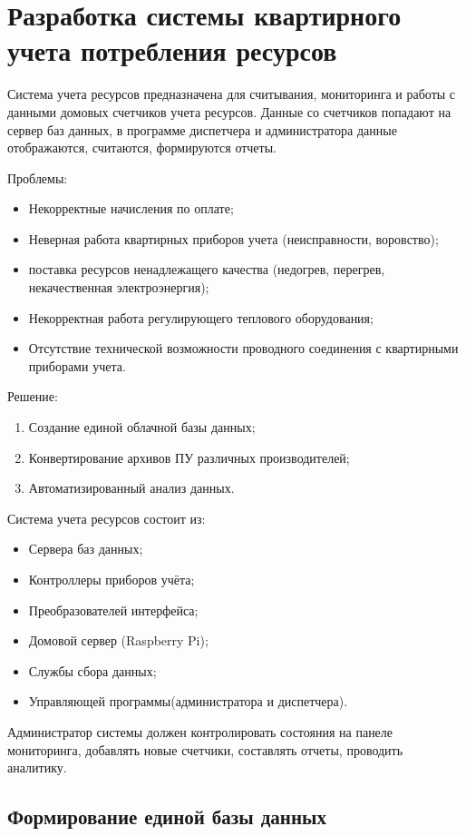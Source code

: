 
\section{Разработка системы квартирного учета потребления ресурсов}
Система учета ресурсов предназначена для считывания, мониторинга и работы с данными домовых счетчиков учета ресурсов. Данные со счетчиков попадают на сервер баз данных, в программе диспетчера и администратора данные отображаются, считаются, формируются отчеты. \cite{NK}

Проблемы:  
\begin{itemize}
	\item Некорректные начисления по оплате; 
	\item Неверная работа квартирных приборов учета (неисправности, воровство); 
	\item поставка ресурсов ненадлежащего качества (недогрев, перегрев, некачественная электроэнергия);
	\item Некорректная работа регулирующего теплового оборудования; 
	\item Отсутствие технической возможности проводного соединения с квартирными приборами учета.
\end{itemize}

Решение: 
\begin{enumerate}
	\item Создание единой облачной базы данных; 
	\item Конвертирование архивов ПУ различных производителей;
	\item Автоматизированный анализ данных.
\end{enumerate}

Система учета ресурсов состоит из:
\begin{itemize}
	\item Сервера баз данных;
	\item Контроллеры приборов учёта;
	\item Преобразователей интерфейса;
	\item Домовой сервер (Raspberry Pi);
	\item Службы сбора данных;
	\item Управляющей программы(администратора и диспетчера).
\end{itemize}
Администратор системы должен контролировать состояния на панеле мониторинга, добавлять новые счетчики, составлять отчеты, проводить аналитику. 

\subsection{Формирование единой базы данных}

